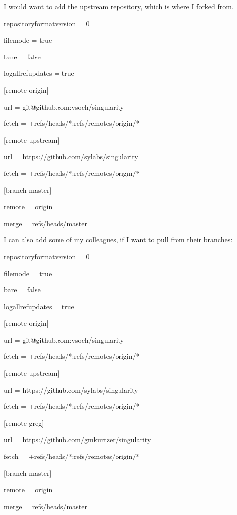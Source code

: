 \documentclass[letterpaper,10pt,english]{sphinxmanual}
\begin{document}
I would want to add the upstream repository, which is where I forked from.

%
\begin{sphinxVerbatim}[commandchars=\\\{\}]
[core]

    repositoryformatversion = 0

    filemode = true

    bare = false

    logallrefupdates = true

[remote \PYGZdq{}origin\PYGZdq{}]

    url = git@github.com:vsoch/singularity

    fetch = +refs/heads/*:refs/remotes/origin/*

[remote \PYGZdq{}upstream\PYGZdq{}]

    url = https://github.com/sylabs/singularity

    fetch = +refs/heads/*:refs/remotes/origin/*

[branch \PYGZdq{}master\PYGZdq{}]

    remote = origin

    merge = refs/heads/master
\end{sphinxVerbatim}

I can also add some of my colleagues, if I want to pull from their branches:

%
\begin{sphinxVerbatim}[commandchars=\\\{\}]
[core]

    repositoryformatversion = 0

    filemode = true

    bare = false

    logallrefupdates = true

[remote \PYGZdq{}origin\PYGZdq{}]

    url = git@github.com:vsoch/singularity

    fetch = +refs/heads/*:refs/remotes/origin/*

[remote \PYGZdq{}upstream\PYGZdq{}]

    url = https://github.com/sylabs/singularity

    fetch = +refs/heads/*:refs/remotes/origin/*

[remote \PYGZdq{}greg\PYGZdq{}]

    url = https://github.com/gmkurtzer/singularity

    fetch = +refs/heads/*:refs/remotes/origin/*

[branch \PYGZdq{}master\PYGZdq{}]

    remote = origin

    merge = refs/heads/master
\end{sphinxVerbatim}
\end{document}
